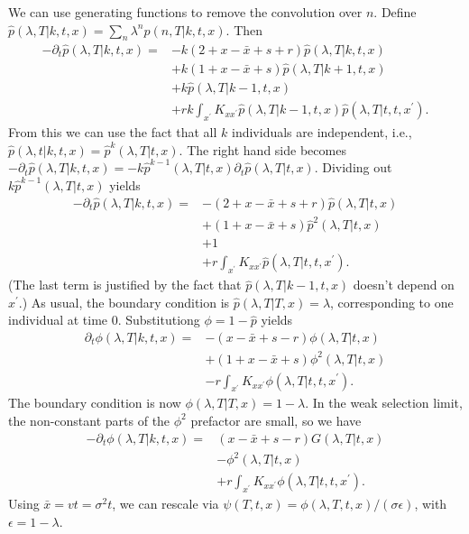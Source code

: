 \documentclass[10pt]{revtex4}
\begin{document}
We can use generating functions to remove the convolution over $n$. Define $\hat{p}(\lambda, T|k,t,x) = \sum_n \lambda^n p(n,T|k,t,x)$. Then
\begin{align*}
-\partial_t \hat{p}(\lambda,T|k,t,x) = &-k(2+x-\bar{x}+s+r)\hat{p}(\lambda,T|k,t,x) \\
& + k(1+x-\bar{x}+s)\hat{p}(\lambda,T|k+1,t,x) \\
& + k\hat{p}(\lambda,T|k-1,t,x) \\
& + rk\int_{x^\prime} K_{x x^\prime} \hat{p}(\lambda, T|k-1, t, x) \hat{p}(\lambda,T|t,t,x^\prime).
\end{align*}
From this we can use the fact that all $k$ individuals are independent, i.e., $\hat{p}(\lambda,t|k,t,x) = \hat{p}^k(\lambda,T|t,x)$.
The right hand side becomes $-\partial_t \hat{p}(\lambda,T|k,t,x) = -k\hat{p}^{k-1}(\lambda,T|t,x)\partial_t \hat{p}(\lambda,T|t,x)$.
Dividing out $k\hat{p}^{k-1}(\lambda,T|t,x)$ yields
\begin{align*}
-\partial_t \hat{p}(\lambda,T|k,t,x) = &-(2+x-\bar{x}+s+r)\hat{p}(\lambda,T|t,x) \\
& + (1+x-\bar{x}+s)\hat{p}^2(\lambda,T|t,x) \\
& + 1 \\
& + r\int_{x^\prime} K_{x x^\prime} \hat{p}(\lambda,T|t,t,x^\prime).
\end{align*}
(The last term is justified by the fact that $\hat{p}(\lambda,T|k-1,t,x)$ doesn't depend on $x^\prime$.)
As usual, the boundary condition is $\hat{p}(\lambda,T|T,x) = \lambda$, corresponding to one individual at time $0$.
Substitutiong $\phi = 1 - \hat{p}$ yields
\begin{align*}
\partial_t \phi(\lambda,T|k,t,x) = &-(x-\bar{x}+s-r)\phi(\lambda,T|t,x) \\
& + (1+x-\bar{x}+s)\phi^2(\lambda,T|t,x) \\
& - r\int_{x^\prime} K_{x x^\prime} \phi(\lambda,T|t,t,x^\prime).
\end{align*}
The boundary condition is now $\phi(\lambda,T|T,x) = 1-\lambda$.
In the weak selection limit, the non-constant parts of the $\phi^2$ prefactor are small, so we have
\begin{align*}
-\partial_t \phi(\lambda,T|k,t,x) = &(x-\bar{x}+s-r)G(\lambda,T|t,x) \\
& - \phi^2(\lambda,T|t,x) \\
& + r\int_{x^\prime} K_{x x^\prime} \phi(\lambda,T|t,t,x^\prime).
\end{align*}
Using $\bar{x} = vt = \sigma^2 t$, we can rescale via $\psi(T,t,x) = \phi(\lambda,T,t,x)/(\sigma\epsilon)$, with $\epsilon = 1-\lambda$.
\end{document}
